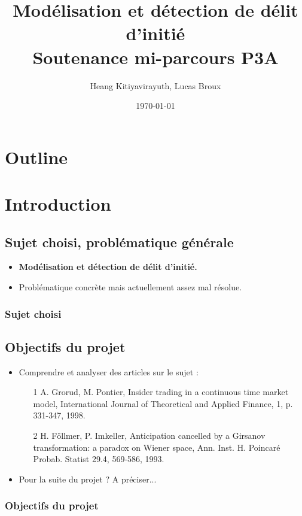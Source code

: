 \documentclass[french]{beamer}
\title{Modélisation et détection de délit d'initié \\ Soutenance mi-parcours P3A}
\author{Heang Kitiyavirayuth, Lucas Broux}
\date{\today}
\begin{document}
\begin{frame}
\titlepage
\end{frame}

\section*{Outline}
\begin{frame}
\tableofcontents
\end{frame}


\section{Introduction}
\subsection{Sujet choisi, problématique générale}
\begin{frame}
  \begin{itemize}[<+->]
    \item \textbf{Modélisation et détection de délit d'initié.}
    \item Problématique concrète mais actuellement assez mal résolue.
\end{itemize}
\frametitle{Sujet choisi}
\end{frame}

\subsection{Objectifs du projet}
\begin{frame}
  \begin{itemize}[<+->]
    \item Comprendre et analyser des articles sur le sujet :
    \begin{itemize}
	\item [1] A. Grorud, M. Pontier, Insider trading in a continuous time market model, International Journal of Theoretical and Applied Finance, 1, p. 331-347, 1998.
	\item [2] H. Föllmer, P. Imkeller, Anticipation cancelled by a Girsanov transformation: a paradox on Wiener space, Ann. Inst. H. Poincaré Probab. Statist 29.4, 569-586, 1993.
	\end{itemize}
    \item Pour la suite du projet ? A préciser...
\end{itemize}
\frametitle{Objectifs du projet}
\end{frame}
\end{document}
